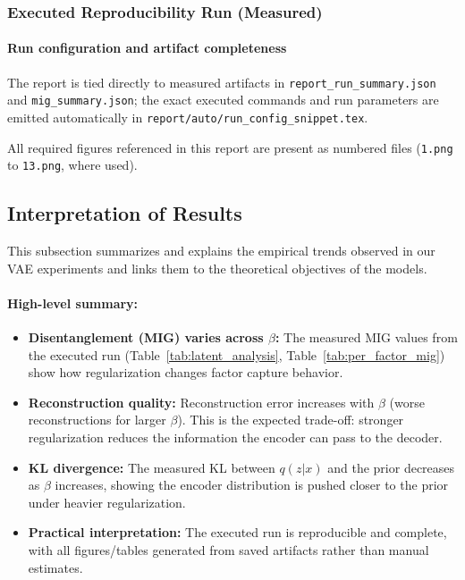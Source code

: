 \documentclass[conference]{IEEEtran}
\begin{document}
\subsubsection{Executed Reproducibility Run (Measured)}



\paragraph{Run configuration and artifact completeness}
The report is tied directly to measured artifacts in
\texttt{report\_run\_summary.json} and \texttt{mig\_summary.json}; the exact
executed commands and run parameters are emitted automatically in
\texttt{report/auto/run\_config\_snippet.tex}.

All required figures referenced in this report are present as numbered files
(\texttt{1.png} to \texttt{13.png}, where used).

\subsection{Interpretation of Results}

This subsection summarizes and explains the empirical trends observed in our VAE experiments and links them to the theoretical objectives of the models.

\paragraph{High-level summary:}
\begin{itemize}
    \item \textbf{Disentanglement (MIG) varies across $\beta$:} The measured MIG values from the executed run (Table~\ref{tab:latent_analysis}, Table~\ref{tab:per_factor_mig}) show how regularization changes factor capture behavior.
    \item \textbf{Reconstruction quality:} Reconstruction error increases with $\beta$ (worse reconstructions for larger $\beta$). This is the expected trade-off: stronger regularization reduces the information the encoder can pass to the decoder.
    \item \textbf{KL divergence:} The measured KL between $q(z|x)$ and the prior decreases as $\beta$ increases, showing the encoder distribution is pushed closer to the prior under heavier regularization.
    \item \textbf{Practical interpretation:} The executed run is reproducible and complete, with all figures/tables generated from saved artifacts rather than manual estimates.
\end{itemize}
\end{document}
